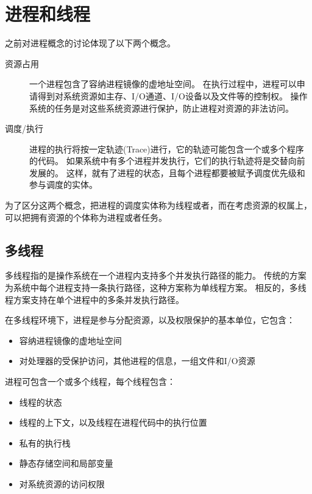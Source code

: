 
\section{进程和线程}
{
    之前对进程概念的讨论体现了以下两个概念。

    \begin{description}
        \item[资源占用]
        {
            一个进程包含了容纳进程镜像的虚地址空间。
            在执行过程中，进程可以申请得到对系统资源如主存、I/O通道、I/O设备以及文件等的控制权。
            操作系统的任务是对这些系统资源进行保护，防止进程对资源的非法访问。
        }
        \item[调度/执行]
        {
            进程的执行将按一定轨迹(Trace)进行，它的轨迹可能包含一个或多个程序的代码。
            如果系统中有多个进程并发执行，它们的执行轨迹将是交替向前发展的。
            这样，就有了进程的状态，且每个进程都要被赋予调度优先级和参与调度的实体。
        }
    \end{description}

    为了区分这两个概念，把进程的调度实体称为线程或者，而在考虑资源的权属上，可以把拥有资源的个体称为进程或者任务。

    \subsection{多线程}
    {
        多线程指的是操作系统在一个进程内支持多个并发执行路径的能力。
        传统的方案为系统中每个进程支持一条执行路径，这种方案称为单线程方案。
        相反的，多线程方案支持在单个进程中的多条并发执行路径。

        在多线程环境下，进程是参与分配资源，以及权限保护的基本单位，它包含：

        \begin{itemize}
            \item 容纳进程镜像的虚地址空间
            \item 对处理器的受保护访问，其他进程的信息，一组文件和I/O资源
        \end{itemize}

        进程可包含一个或多个线程，每个线程包含：

        \begin{itemize}
            \item 线程的状态
            \item 线程的上下文，以及线程在进程代码中的执行位置
            \item 私有的执行栈
            \item 静态存储空间和局部变量
            \item 对系统资源的访问权限
        \end{itemize}

}}
